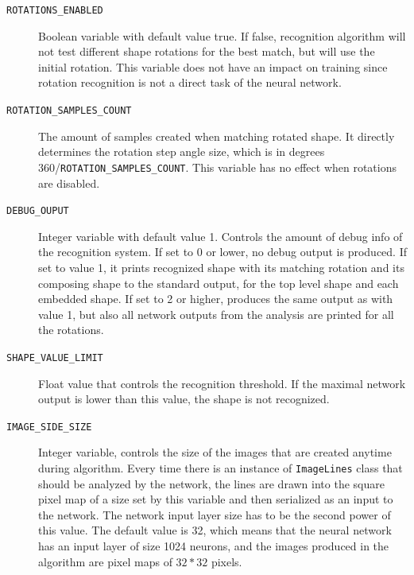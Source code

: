 \begin{description}
\item[\texttt{ROTATIONS\_ENABLED}] Boolean variable with default value true. If false, recognition algorithm will not test different shape rotations for the best match, but will use the initial rotation. This variable does not have an impact on training since rotation recognition is not a direct task of the neural network.

\item[\texttt{ROTATION\_SAMPLES\_COUNT}] The amount of samples created when matching rotated shape. It directly determines the rotation step angle size, which is in degrees 360/\texttt{ROTATION\_SAMPLES\_COUNT}. This variable has no effect when rotations are disabled.

\item[\texttt{DEBUG\_OUPUT}] Integer variable with default value 1. Controls the amount of debug info of the recognition system. If set to 0 or lower, no debug output is produced. If set to value 1, it prints recognized shape with its matching rotation and its composing shape to the standard output, for the top level shape and each embedded shape. If set to 2 or higher, produces the same output as with value 1, but also all network outputs from the analysis are printed for all the rotations.

\item[\texttt{SHAPE\_VALUE\_LIMIT}] Float value that controls the recognition threshold. If the maximal network output is lower than this value, the shape is not recognized.

\item[\texttt{IMAGE\_SIDE\_SIZE}] Integer variable, controls the size of the images that are created anytime during algorithm. Every time there is an instance of \texttt{ImageLines} class that should be analyzed by the network, the lines are drawn into the square pixel map of a size set by this variable and then serialized as an input to the network. The network input layer size has to be the second power of this value. The default value is 32, which means that the neural network has an input layer of size 1024 neurons, and the images produced in the algorithm are pixel maps of $32*32$ pixels.

\end{description}

